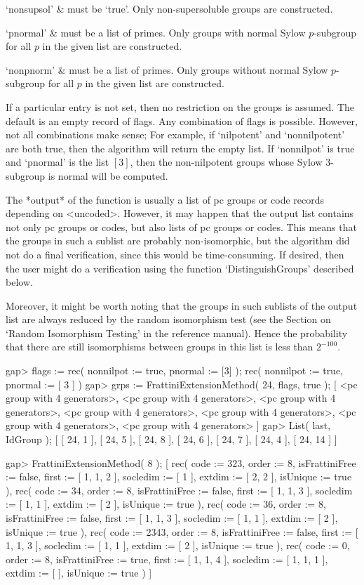  `nonsupsol' &
      must be `true'. Only non-supersoluble groups are constructed.

 `pnormal' &
      must be a list of primes. Only groups with normal Sylow $p$-subgroup
      for all $p$ in the given list are constructed.

 `nonpnorm' &
      must be a list of primes. Only groups without normal Sylow $p$-subgroup
      for all $p$ in the given list are constructed.
\enditems

If a particular entry is not set, then no restriction on the
groups is assumed. The default is an empty record of flags. Any
combination of flags is possible. However, not all combinations make
sense; For example, if `nilpotent' and `nonnilpotent' are both true,
then the algorithm will return the empty list. If `nonnilpot' is
true and `pnormal' is the list $[3]$, then the non-nilpotent groups
whose Sylow 3-subgroup is normal will be computed.

The *output* of the function is usually a list of pc groups or code
records depending on <uncoded>. However, it may happen that the output
list contains not only pc groups or codes, but also lists of pc groups
or codes. This means that the groups in such a sublist are probably
non-isomorphic, but the algorithm did not do a final verification, since
this would be time-consuming. If desired, then the user might do
a verification using the function `DistinguishGroups' described
below.

Moreover, it might be worth noting that the groups in such sublists
of the output list are always reduced by the random isomorphism test
(see the Section on `Random Isomorphism Testing' in the reference manual).
Hence the probability that there are still isomorphisms between
groups in this list is less than $2^{-100}$.

\beginexample
gap> flags := rec( nonnilpot := true, pnormal := [3] );
rec( nonnilpot := true, pnormal := [ 3 ] )
gap> grps := FrattiniExtensionMethod( 24, flags, true );
[ <pc group with 4 generators>, <pc group with 4 generators>, 
  <pc group with 4 generators>, <pc group with 4 generators>, 
  <pc group with 4 generators>, <pc group with 4 generators>, 
  <pc group with 4 generators> ]
gap> List( last, IdGroup );
[ [ 24, 1 ], [ 24, 5 ], [ 24, 8 ], [ 24, 6 ], [ 24, 7 ], [ 24, 4 ], 
  [ 24, 14 ] ]

gap> FrattiniExtensionMethod( 8 );
[ rec( code := 323, order := 8, isFrattiniFree := false, first := [ 1, 1, 2 ],
      socledim := [ 1 ], extdim := [ 2, 2 ], isUnique := true ), 
  rec( code := 34, order := 8, isFrattiniFree := false, first := [ 1, 1, 3 ], 
      socledim := [ 1, 1 ], extdim := [ 2 ], isUnique := true ), 
  rec( code := 36, order := 8, isFrattiniFree := false, first := [ 1, 1, 3 ], 
      socledim := [ 1, 1 ], extdim := [ 2 ], isUnique := true ), 
  rec( code := 2343, order := 8, isFrattiniFree := false, 
      first := [ 1, 1, 3 ], socledim := [ 1, 1 ], extdim := [ 2 ], 
      isUnique := true ), 
  rec( code := 0, order := 8, isFrattiniFree := true, first := [ 1, 1, 4 ], 
      socledim := [ 1, 1, 1 ], extdim := [  ], isUnique := true ) ]
\endexample

